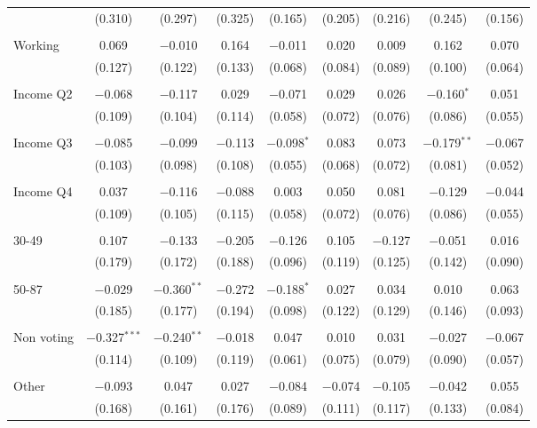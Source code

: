 \begin{tabular}{@{\extracolsep{5pt}}lcccccccc}
  & (0.310) & (0.297) & (0.325) & (0.165) & (0.205) & (0.216) & (0.245) & (0.156) \\ 
  & & & & & & & & \\ 
 Working & 0.069 & $-$0.010 & 0.164 & $-$0.011 & 0.020 & 0.009 & 0.162 & 0.070 \\ 
  & (0.127) & (0.122) & (0.133) & (0.068) & (0.084) & (0.089) & (0.100) & (0.064) \\ 
  & & & & & & & & \\ 
 Income Q2 & $-$0.068 & $-$0.117 & 0.029 & $-$0.071 & 0.029 & 0.026 & $-$0.160$^{*}$ & 0.051 \\ 
  & (0.109) & (0.104) & (0.114) & (0.058) & (0.072) & (0.076) & (0.086) & (0.055) \\ 
  & & & & & & & & \\ 
 Income Q3 & $-$0.085 & $-$0.099 & $-$0.113 & $-$0.098$^{*}$ & 0.083 & 0.073 & $-$0.179$^{**}$ & $-$0.067 \\ 
  & (0.103) & (0.098) & (0.108) & (0.055) & (0.068) & (0.072) & (0.081) & (0.052) \\ 
  & & & & & & & & \\ 
 Income Q4 & 0.037 & $-$0.116 & $-$0.088 & 0.003 & 0.050 & 0.081 & $-$0.129 & $-$0.044 \\ 
  & (0.109) & (0.105) & (0.115) & (0.058) & (0.072) & (0.076) & (0.086) & (0.055) \\ 
  & & & & & & & & \\ 
 30-49 & 0.107 & $-$0.133 & $-$0.205 & $-$0.126 & 0.105 & $-$0.127 & $-$0.051 & 0.016 \\ 
  & (0.179) & (0.172) & (0.188) & (0.096) & (0.119) & (0.125) & (0.142) & (0.090) \\ 
  & & & & & & & & \\ 
 50-87 & $-$0.029 & $-$0.360$^{**}$ & $-$0.272 & $-$0.188$^{*}$ & 0.027 & 0.034 & 0.010 & 0.063 \\ 
  & (0.185) & (0.177) & (0.194) & (0.098) & (0.122) & (0.129) & (0.146) & (0.093) \\ 
  & & & & & & & & \\ 
 Non voting & $-$0.327$^{***}$ & $-$0.240$^{**}$ & $-$0.018 & 0.047 & 0.010 & 0.031 & $-$0.027 & $-$0.067 \\ 
  & (0.114) & (0.109) & (0.119) & (0.061) & (0.075) & (0.079) & (0.090) & (0.057) \\ 
  & & & & & & & & \\ 
 Other & $-$0.093 & 0.047 & 0.027 & $-$0.084 & $-$0.074 & $-$0.105 & $-$0.042 & 0.055 \\ 
  & (0.168) & (0.161) & (0.176) & (0.089) & (0.111) & (0.117) & (0.133) & (0.084) \\ 

\end{tabular}
